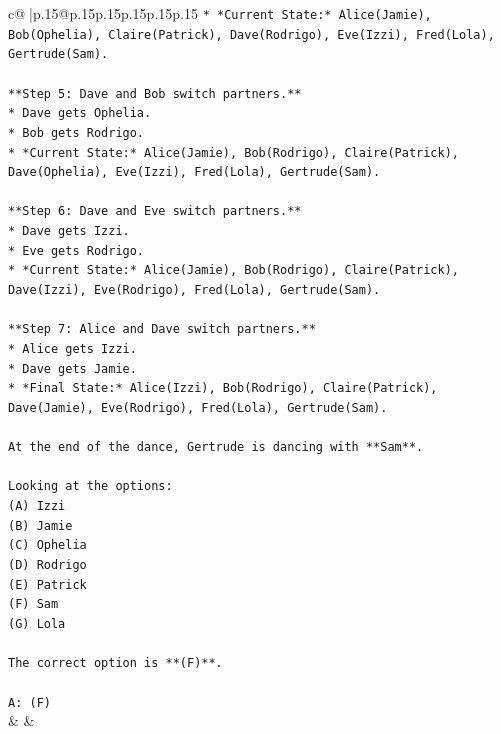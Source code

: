 \documentclass{article}
\begin{document}
{\begin{supertabular}{c@{$\;$}|p{.15\linewidth}@{}p{.15\linewidth}p{.15\linewidth}p{.15\linewidth}p{.15\linewidth}p{.15\linewidth}}
{{{\texttt{*   *Current State:* Alice(Jamie), Bob(Ophelia), Claire(Patrick), Dave(Rodrigo), Eve(Izzi), Fred(Lola), Gertrude(Sam).} \\
\\ 
\texttt{**Step 5: Dave and Bob switch partners.**} \\
\texttt{*   Dave gets Ophelia.} \\
\texttt{*   Bob gets Rodrigo.} \\
\texttt{*   *Current State:* Alice(Jamie), Bob(Rodrigo), Claire(Patrick), Dave(Ophelia), Eve(Izzi), Fred(Lola), Gertrude(Sam).} \\
\\ 
\texttt{**Step 6: Dave and Eve switch partners.**} \\
\texttt{*   Dave gets Izzi.} \\
\texttt{*   Eve gets Rodrigo.} \\
\texttt{*   *Current State:* Alice(Jamie), Bob(Rodrigo), Claire(Patrick), Dave(Izzi), Eve(Rodrigo), Fred(Lola), Gertrude(Sam).} \\
\\ 
\texttt{**Step 7: Alice and Dave switch partners.**} \\
\texttt{*   Alice gets Izzi.} \\
\texttt{*   Dave gets Jamie.} \\
\texttt{*   *Final State:* Alice(Izzi), Bob(Rodrigo), Claire(Patrick), Dave(Jamie), Eve(Rodrigo), Fred(Lola), Gertrude(Sam).} \\
\\ 
\texttt{At the end of the dance, Gertrude is dancing with **Sam**.} \\
\\ 
\texttt{Looking at the options:} \\
\texttt{(A) Izzi} \\
\texttt{(B) Jamie} \\
\texttt{(C) Ophelia} \\
\texttt{(D) Rodrigo} \\
\texttt{(E) Patrick} \\
\texttt{(F) Sam} \\
\texttt{(G) Lola} \\
\\ 
\texttt{The correct option is **(F)**.} \\
\\ 
\texttt{A: (F)} \\
            }
        }
    }
    & & \\ \\


\end{supertabular}}
\end{document}
